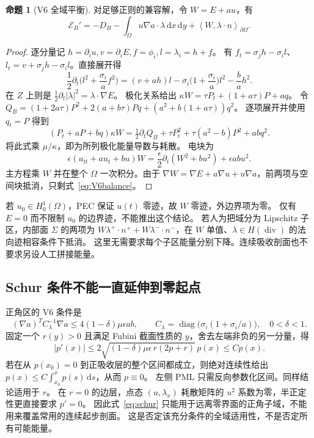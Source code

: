 \documentclass[UTF8,a4paper,11pt,fontset=none]{ctexart}
\numberwithin{equation}{section}
\theoremstyle{definition}
\newtheorem{proposition}[theorem]{命题}
\theoremstyle{definition}
\newcommand{\Om}{\Omega}
\newcommand{\eps}{\epsilon}
\newcommand{\dd}{\,\mathrm d}
\newcommand{\Ecal}{\mathcal E}
\newcommand{\ip}[2]{\left\langle #1,#2\right\rangle}
\DeclareMathOperator{\diver}{div}
\begin{document}
\begin{proposition}[V6 全域平衡]\label{prop:V6balance}
对足够正则的兼容解，令 $W=E+au$，有
\begin{equation}\label{eq:V6balance}
 \Ecal_B'=-D_B-\int_\Om u\nabla a\cdot\lambda\dd x\dd y
                 +\ip{W}{\lambda\cdot n}_{\partial\Om}.
\end{equation}
\end{proposition}
\begin{proof}
逐分量记 $h=\partial_i u,v=\partial_iE,f=\phi_i,l=\lambda_i=h+f$。
有 $f_t=\sigma_j h-\sigma_i l$、$l_t=v+\sigma_jh-\sigma_i l$。直接展开得
\[
 \frac12\partial_t\Big(l^2+\frac{\sigma_i}{a}f^2\Big)
 =(v+ah)l-\sigma_i\Big(1+\frac{\sigma_i}{a}\Big)l^2-\frac ba h^2.
\]
在 $Z$ 上则是 $\frac12\partial_t|\lambda|^2=\lambda\cdot\nabla E$。
极化关系给出 $\kappa W=\tau P_t+(1+a\tau)P+aq$。
令 $Q_B=(1+2a\tau)P^2+2(a+b\tau)Pq+(a^2+b(1+a\tau))q^2$。
逐项展开并使用 $q_t=P$ 得到
\[
 (P_t+aP+bq)\kappa W
 =\tfrac12\partial_t Q_B+\tau P_t^2+\tau(a^2-b)P^2+abq^2.
\]
将此式乘 $\mu/\kappa$，即为所列极化能量导数与耗散。
电块为
\[
 \eps(u_{tt}+au_t+bu)W
 =\frac\eps2\partial_t(W^2+bu^2)+\eps ab u^2.
\]
主方程乘 $W$ 并在整个 $\Om$ 一次积分。由于
$\nabla W=\nabla E+a\nabla u+u\nabla a$，前两项与空间块抵消，只剩式~\eqref{eq:V6balance}。
\end{proof}

若 $u_0\in H_0^1(\Om)$，PEC 保证 $u(t)$ 零迹，故 $W$ 零迹，外边界项为零。
仅有 $E=0$ 而不限制 $u_0$ 的边界迹，不能推出这个结论。
若人为把域分为 Lipschitz 子区，内部面 $\Sigma$ 的两项为
$W\lambda^+\cdot n^++W\lambda^-\cdot n^-$，在 $W$ 单值、$\lambda\in H(\diver)$ 的法向迹相容条件下抵消。
这里无需要求每个子区能量分别下降。连续吸收剖面也不要求另设人工拼接能量。

\subsection{Schur 条件不能一直延伸到零起点}
正角区的 V6 条件是
\begin{equation}\label{eq:schur}
 (\nabla a)^TC_\lambda^{-1}\nabla a
 \le4(1-\delta)\mu\eps ab,\qquad
 C_\lambda=\operatorname{diag}\Big(\sigma_i(1+\sigma_i/a)\Big),\quad 0<\delta<1.
\end{equation}
固定一个 $r(y)>0$ 且满足 Fubini 截面性质的 $y$，舍去左端非负的另一分量，得
\[
 |p'(x)|\le2\sqrt{(1-\delta)\mu\eps\,r(2p+r)}\,p(x)\le C p(x).
\]
若在从 $p(x_0)=0$ 到正吸收层的整个区间都成立，则绝对连续性给出
$p(x)\le C\int_{x_0}^xp(s)\dd s$，从而 $p\equiv0$。
左侧 PML 只需反向参数化区间。同样结论适用于 $r$。
在 $r=0$ 的边层，点态 $(u,\lambda_x)$ 耗散矩阵的 $u^2$ 系数为零，半正定性更直接要求 $p'=0$。
因此式~\eqref{eq:schur} 只能用于远离零界面的正角子域，不能用来覆盖常用的连续起步剖面。
这是否定该充分条件的全域适用性，不是否定所有可能能量。
\end{document}
